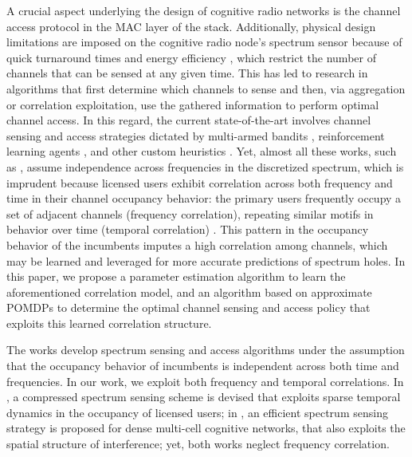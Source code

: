 \documentclass[10pt,twocolumn]{IEEEtran}
\begin{document}
A crucial aspect underlying the design of cognitive radio networks is the channel access protocol in the MAC layer of the stack. Additionally, physical design limitations are imposed on the cognitive radio node's spectrum sensor because of quick turnaround times and energy efficiency \cite{5990482}, which restrict the number of channels that can be sensed at any given time. This has led to research in algorithms that first determine which channels to sense and then, via aggregation or correlation exploitation, use the gathered information to perform optimal channel access. In this regard, the current state-of-the-art involves channel sensing and access strategies dictated by multi-armed bandits \cite{7094730}, reinforcement learning agents \cite{6507570}, and other custom heuristics \cite{6956794, 4554696}. Yet, almost all these works, such as \cite{7094730, 6507570}, assume independence across frequencies in the discretized spectrum, which is imprudent because licensed users exhibit correlation across both frequency and time in their channel occupancy behavior: the primary users frequently occupy a set of adjacent channels (frequency correlation), repeating similar motifs in behavior over time (temporal correlation) \cite{6188346, 4213046, McHenry:2006:CSO:1234388.1234389}. This pattern in the occupancy behavior of the incumbents imputes a high correlation among channels, which may be learned and  leveraged for more accurate predictions of spectrum holes. In this paper, we propose a parameter estimation algorithm to learn the aforementioned correlation model, and
an algorithm based on approximate POMDPs to determine the optimal channel sensing and access policy that exploits this learned correlation structure.

 The works \cite{7094730, 5167826, 7895211} develop spectrum sensing and access algorithms under the assumption that the occupancy behavior of incumbents is independent across both time and frequencies. In our work, we exploit both frequency and temporal correlations. In \cite{7336513}, a compressed spectrum sensing scheme is devised that exploits sparse temporal dynamics in the occupancy of licensed users; in \cite{8571293}, an efficient spectrum sensing strategy is proposed for dense multi-cell cognitive networks, that also exploits the spatial structure of interference; yet, both works neglect frequency correlation.
\end{document}

